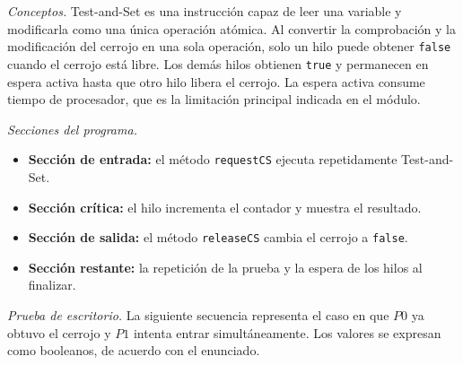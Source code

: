 \documentclass[12pt,oneside]{template/liverpoolthesis}
\begin{document}
\emph{Conceptos.} Test-and-Set es una instrucción capaz de leer una variable y
modificarla como una única operación atómica. Al convertir la comprobación y
la modificación del cerrojo en una sola operación, solo un hilo puede
obtener \texttt{false} cuando el cerrojo está libre. Los demás hilos obtienen
\texttt{true} y permanecen en espera activa hasta que otro hilo libera el
cerrojo. La espera activa consume tiempo de procesador, que es la limitación
principal indicada en el módulo.

\emph{Secciones del programa.}
\begin{itemize}
  \item \textbf{Sección de entrada:} el método \texttt{requestCS} ejecuta
  repetidamente Test-and-Set.
  \item \textbf{Sección crítica:} el hilo incrementa el contador y muestra
  el resultado.
  \item \textbf{Sección de salida:} el método \texttt{releaseCS} cambia el
  cerrojo a \texttt{false}.
  \item \textbf{Sección restante:} la repetición de la prueba y la espera de
  los hilos al finalizar.
\end{itemize}

\emph{Prueba de escritorio.} La siguiente secuencia representa el caso en
que $P0$ ya obtuvo el cerrojo y $P1$ intenta entrar simultáneamente. Los
valores se expresan como booleanos, de acuerdo con el enunciado.

\begin{center}
\scriptsize
{}%
\end{center}
\end{document}
